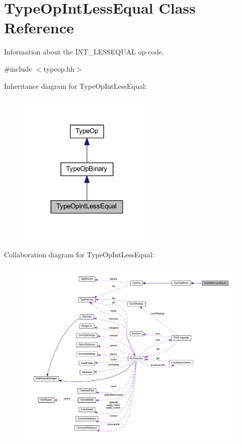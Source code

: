 \hypertarget{class_type_op_int_less_equal}{}\section{Type\+Op\+Int\+Less\+Equal Class Reference}
\label{class_type_op_int_less_equal}


Information about the I\+N\+T\+\_\+\+L\+E\+S\+S\+E\+Q\+U\+AL op-\/code.  




{\ttfamily \#include $<$typeop.\+hh$>$}



Inheritance diagram for Type\+Op\+Int\+Less\+Equal\+:
\nopagebreak
\begin{figure}[H]
\begin{center}
\leavevmode
\includegraphics[width=187pt]{class_type_op_int_less_equal__inherit__graph}
\end{center}
\end{figure}


Collaboration diagram for Type\+Op\+Int\+Less\+Equal\+:
\nopagebreak
\begin{figure}[H]
\begin{center}
\leavevmode
\includegraphics[width=350pt]{class_type_op_int_less_equal__coll__graph}
\end{center}
\end{figure}
